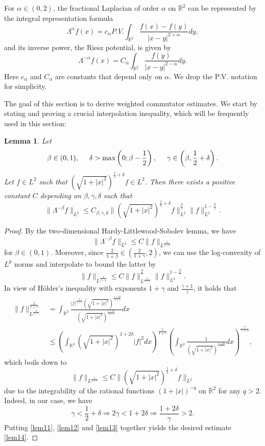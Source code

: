 \documentclass[12pt,reqno]{amsart}
\newcommand{\la}{\label}
\newcommand{\be}{\begin{equation}}
\newcommand{\ee}{\end{equation}}
\newtheorem{lemma}[thm]{Lemma}
\newcommand{\R}{\mathbb R}
\begin{document}
For $\alpha \in (0,2)$, the fractional Laplacian of order $\alpha$ on $\R^2$ can be represented by the integral representation formula
\be \la{fracint}
\Lambda^{\alpha} f(x) = c_{\alpha} P.V. \int_{\R^2} \frac{f(x) - f(y)}{|x-y|^{2+\alpha}} dy, 
\ee 
and its inverse power, the Riesz potential, is given by 
\be \la{rieszpotential}
\Lambda^{-\alpha} f(x) = C_{\alpha}\int_{\R^2} \frac{f(y)}{|x-y|^{2-\alpha}} dy.
\ee Here $c_{\alpha}$ and $C_{\alpha}$ are constants that depend only on $\alpha$. We drop the P.V. notation for simplicity.

The goal of this section is to derive weighted commutator estimates. We start by stating and proving a crucial interpolation inequality, which will be frequently used in this section:

\begin{lemma} Let 
\be 
\beta \in (0,1), \hspace{0.5cm} \delta > \max \left(0; \beta - \frac{1}{2} \right), \hspace{0.5cm} \gamma \in \left(\beta, \frac{1}{2}+\delta \right).
\ee  Let $f \in L^2$ such that $(\sqrt{1+|x|^2})^{\frac{1}{2}+\delta}f \in L^2$. Then there exists a positive constant $C$ depending on $\beta, \gamma, \delta$ such that 
\be \label{lem14}
\|\Lambda^{-\beta} f\|_{L^2} 
\le C_{\beta, \gamma, \delta} \|(\sqrt{1+|x|^2})^{\frac{1}{2}+\delta} f\|_{L^2}^{\frac{\beta}{\gamma}} \|f\|_{L^2}^{1-\frac{\beta}{\gamma}}.
\ee 
\end{lemma}

\begin{proof}
By the two-dimensional Hardy-Littlewood-Sobolev lemma, we have 
\be \label{lem11}
\|\Lambda^{-\beta}f\|_{L^2} 
\le C\|f\|_{L^{\frac{2}{1+\beta}}}
\ee for $\beta \in (0,1)$. Moreover, since $\frac{2}{1+\beta} \in (\frac{2}{1+\gamma} ,2)$, we can use the log-convexity of $L^p$ norms and interpolate to bound the latter by 
\be \label{lem12}
\|f\|_{L^{\frac{2}{1+\beta}}}
\le C\|f\|_{L^{\frac{2}{1+\gamma}}}^{\frac{\beta}{\gamma}} \|f\|_{L^2}^{1-\frac{\beta}{\gamma}}.
\ee 
In view of H\"older's inequality with exponents $1+\gamma$ and $\frac{\gamma + 1}{\gamma}$, it holds that 
\be 
\begin{aligned}
\|f\|_{L^{\frac{2}{1+\gamma}}}^{\frac{2}{1+\gamma}}
&= \int_{\R^2} \frac{|f|^{\frac{2}{1+\gamma}}(\sqrt{1+|x|^2})^{\frac{1+2\delta}{1+\gamma}}}{(\sqrt{1+|x|^2})^{\frac{1+2\delta}{1+\gamma}}}
dx
\\&\le \left(\int_{\R^2} (\sqrt{1+|x|^2})^{1+2\delta} |f|^2 dx \right)^{\frac{1}{1+\gamma}} \left(\int_{\R^2} \frac{1}{(\sqrt{1+|x|^2})^{\frac{1+2\delta}{\gamma}}} dx \right)^{\frac{\gamma}{\gamma+1}},
\end{aligned}
\ee which boils down to 
\be \label{lem13}
\|f\|_{L^{\frac{2}{1+\gamma}}} \le C\|(\sqrt{1+|x|^2})^{\frac{1}{2}+\delta} f\|_{L^2}
\ee due to the integrability of the rational  functions $(1+|x|)^{-q}$ on $\R^2$ for any $q > 2$. Indeed, in our case, we have 
\be 
\gamma < \frac{1}{2}+\delta \Rightarrow 2\gamma < 1+2\delta \Rightarrow \frac{1+2\delta}{\gamma} > 2. 
\ee Putting \eqref{lem11}, \eqref{lem12} and \eqref{lem13} together yields the desired estimate \eqref{lem14}.  
\end{proof}
\end{document}
